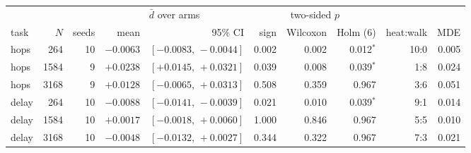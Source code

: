 {\footnotesize\setlength{\tabcolsep}{3.5pt}
\begin{tabular}{@{}lrrrrrrrrr@{}}
\toprule
& & & \multicolumn{2}{c}{$\bar d$ over arms} & \multicolumn{3}{c}{two-sided $p$} & & \\
\cmidrule(lr){4-5}\cmidrule(lr){6-8}
task & $N$ & seeds & mean & 95\% CI & sign & Wilcoxon & Holm (6) & heat:walk & MDE \\
\midrule
hops & 264 & 10 & $-0.0063$ & $[-0.0083,\,-0.0044]$ & 0.002 & 0.002 & 0.012$^{*}$ & 10:0 & 0.005 \\
hops & 1584 & 9 & $+0.0238$ & $[+0.0145,\,+0.0321]$ & 0.039 & 0.008 & 0.039$^{*}$ & 1:8 & 0.024 \\
hops & 3168 & 9 & $+0.0128$ & $[-0.0065,\,+0.0313]$ & 0.508 & 0.359 & 0.967 & 3:6 & 0.051 \\
delay & 264 & 10 & $-0.0088$ & $[-0.0141,\,-0.0039]$ & 0.021 & 0.010 & 0.039$^{*}$ & 9:1 & 0.014 \\
delay & 1584 & 10 & $+0.0017$ & $[-0.0018,\,+0.0060]$ & 1.000 & 0.846 & 0.967 & 5:5 & 0.010 \\
delay & 3168 & 10 & $-0.0048$ & $[-0.0132,\,+0.0027]$ & 0.344 & 0.322 & 0.967 & 7:3 & 0.021 \\
\bottomrule
\end{tabular}
}
